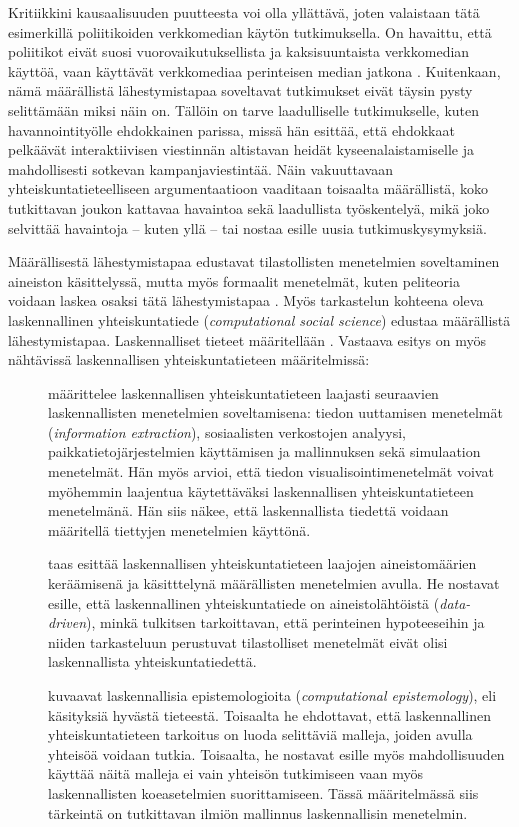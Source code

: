 \documentclass[finnish,gradu,twoside,12pt]{tktltiki}
\begin{document}
Kritiikkini kausaalisuuden puutteesta voi olla yllättävä, joten valaistaan tätä esimerkillä poliitikoiden verkkomedian käytön tutkimuksella. On havaittu, että poliitikot eivät suosi vuorovaikutuksellista ja kaksisuuntaista verkkomedian käyttöä, vaan käyttävät verkkomediaa perinteisen median jatkona \citep{Golbeck2010,}. Kuitenkaan, nämä määrällistä lähestymistapaa soveltavat tutkimukset eivät täysin pysty selittämään miksi näin on. Tällöin on tarve laadulliselle tutkimukselle, kuten \citet{Stromer-Galley2000} havannointityölle ehdokkainen parissa, missä hän esittää, että ehdokkaat pelkäävät interaktiivisen viestinnän altistavan heidät kyseenalaistamiselle ja mahdollisesti sotkevan kampanjaviestintää. Näin vakuuttavaan yhteiskuntatieteelliseen argumentaatioon vaaditaan toisaalta määrällistä, koko tutkittavan joukon kattavaa havaintoa sekä laadullista työskentelyä, mikä joko selvittää havaintoja -- kuten yllä -- tai nostaa esille uusia tutkimuskysymyksiä.

Määrällisestä lähestymistapaa edustavat tilastollisten menetelmien soveltaminen aineiston käsittelyssä, mutta myös formaalit menetelmät, kuten peliteoria voidaan laskea osaksi tätä lähestymistapaa \citep{a}. Myös tarkastelun kohteena oleva laskennallinen yhteiskuntatiede (\textit{computational social science}) edustaa määrällistä lähestymistapaa. Laskennalliset tieteet määritellään \citep{a,b,c}. Vastaava esitys on myös nähtävissä laskennallisen yhteiskuntatieteen määritelmissä:

\begin{description}
\item[\citet{cioffi-revilla10}] määrittelee laskennallisen yhteiskuntatieteen laajasti seuraavien laskennallisten menetelmien soveltamisena: tiedon uuttamisen menetelmät (\textit{information extraction}), sosiaalisten verkostojen analyysi, paikkatietojärjestelmien käyttämisen ja mallinnuksen sekä simulaation menetelmät. Hän myös arvioi, että tiedon visualisointimenetelmät voivat myöhemmin laajentua käytettäväksi laskennallisen yhteiskuntatieteen menetelmänä. Hän siis näkee, että laskennallista tiedettä voidaan määritellä tiettyjen menetelmien käyttönä.
\item[\citet{lazer09}] taas esittää laskennallisen yhteiskuntatieteen laajojen aineistomäärien keräämisenä ja käsitttelynä määrällisten menetelmien avulla. He nostavat esille, että laskennallinen yhteiskuntatiede on aineistolähtöistä (\textit{data-driven}), minkä tulkitsen tarkoittavan, että perinteinen hypoteeseihin ja niiden tarkasteluun perustuvat tilastolliset menetelmät eivät olisi laskennallista yhteiskuntatiedettä.
\item[\cite{bankes02}] kuvaavat laskennallisia epistemologioita (\textit{computational epistemology}), eli käsityksiä hyvästä tieteestä. Toisaalta he ehdottavat, että laskennallinen yhteiskuntatieteen tarkoitus on luoda selittäviä malleja, joiden avulla yhteisöä voidaan tutkia. Toisaalta, he nostavat esille myös mahdollisuuden käyttää näitä malleja ei vain yhteisön tutkimiseen vaan myös laskennallisten koeasetelmien suorittamiseen. Tässä määritelmässä siis tärkeintä on tutkittavan ilmiön mallinnus laskennallisin menetelmin.
\end{description}
\end{document}
